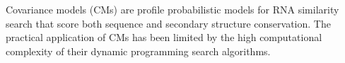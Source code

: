 Covariance models (CMs) are profile probabilistic models for RNA
similarity search that score both sequence and secondary structure
conservation.  The practical application of CMs has been limited by
the high computational complexity of their dynamic programming search
algorithms.
